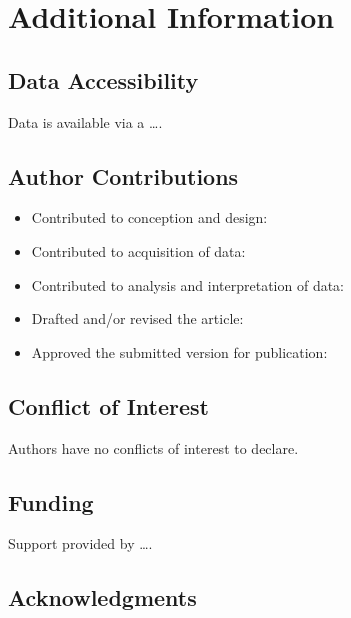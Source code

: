 \documentclass[]{cik}%
\begin{document}
\newpage

\hypertarget{additional-information}{%
\section{Additional Information}\label{additional-information}}

\hypertarget{data-accessibility}{%
\subsection{Data Accessibility}\label{data-accessibility}}

Data is available via a \ldots.

\hypertarget{author-contributions}{%
\subsection{Author Contributions}\label{author-contributions}}

\begin{itemize}
\tightlist
\item
  Contributed to conception and design:
\item
  Contributed to acquisition of data:
\item
  Contributed to analysis and interpretation of data:
\item
  Drafted and/or revised the article:
\item
  Approved the submitted version for publication:
\end{itemize}

\hypertarget{conflict-of-interest}{%
\subsection{Conflict of Interest}\label{conflict-of-interest}}

Authors have no conflicts of interest to declare.

\hypertarget{funding}{%
\subsection{Funding}\label{funding}}

Support provided by \ldots.

\hypertarget{acknowledgments}{%
\subsection{Acknowledgments}\label{acknowledgments}}
\end{document}
